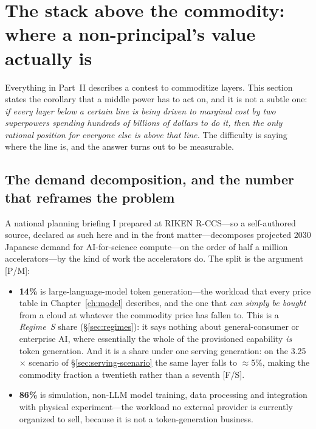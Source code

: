 \section{The stack above the commodity: where a non-principal's value actually is}
\label{sec:ai4si-stack}

Everything in Part~II describes a contest to commoditize layers. This section states the corollary that a middle power has to act on, and it is not a subtle one: \emph{if every layer below a certain line is being driven to marginal cost by two superpowers spending hundreds of billions of dollars to do it, then the only rational position for everyone else is above that line.} The difficulty is saying where the line is, and the answer turns out to be measurable.

\subsection{The demand decomposition, and the number that reframes the problem}

A national planning briefing I prepared at RIKEN R-CCS---so a self-authored source, declared as such here and in the front matter---decomposes projected 2030 Japanese demand for AI-for-science compute---on the order of half a million accelerators---by the kind of work the accelerators do. The split is the argument~\cite{ai4si-stack} [P/M]:

\begin{itemize}\itemsep2pt
  \item \textbf{14\%} is large-language-model token generation---the workload that every price table in Chapter~\ref{ch:model} describes, and the one that \emph{can simply be bought} from a cloud at whatever the commodity price has fallen to. This is a \emph{Regime~S} share (\S\ref{sec:regimes}): it says nothing about general-consumer or enterprise AI, where essentially the whole of the provisioned capability \emph{is} token generation. And it is a share under one serving generation: on the 3.25$\times$ scenario of \S\ref{sec:serving-scenario} the same layer falls to $\approx$5\%, making the commodity fraction a twentieth rather than a seventh [F/S].
  \item \textbf{86\%} is simulation, non-LLM model training, data processing and integration with physical experiment---the workload no external provider is currently organized to sell, because it is not a token-generation business.
\end{itemize}

